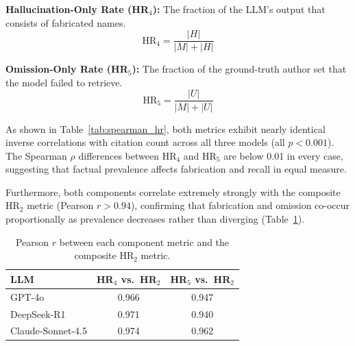 \documentclass[11pt]{article}
\begin{document}
\textbf{Hallucination-Only Rate (HR$_4$):} The fraction of the LLM's output that consists of fabricated names.
\begin{equation}
    \text{HR}_4 = \frac{|H|}{|M| + |H|}\label{eqn:hr4}
\end{equation}

\textbf{Omission-Only Rate (HR$_5$):} The fraction of the ground-truth author set that the model failed to retrieve.
\begin{equation}
    \text{HR}_5 = \frac{|U|}{|M| + |U|}\label{eqn:hr5}
\end{equation}

As shown in Table~\ref{tab:spearman_hr}, both metrics exhibit nearly identical inverse correlations with citation count across all three models (all $p < 0.001$). The Spearman $\rho$ differences between HR$_4$ and HR$_5$ are below 0.01 in every case, suggesting that factual prevalence affects fabrication and recall in equal measure.

\begin{table}[tb!]
  \centering
  \caption{Spearman $\rho$ between citation count and each hallucination metric across all three models. All $p < 0.001$.}
  \label{tab:spearman_hr}
\end{table}

Furthermore, both components correlate extremely strongly with the composite HR$_2$ metric (Pearson $r > 0.94$), confirming that fabrication and omission co-occur proportionally as prevalence decreases rather than diverging (Table~\ref{tab:pearson_hr}).

\begin{table}[tb!]
  \centering
  \small

  \begin{tabular}{@{}lcc@{}}
    \toprule
    \textbf{LLM} & \textbf{HR$_4$ vs.\ HR$_2$} & \textbf{HR$_5$ vs.\ HR$_2$} \\
    \midrule
    GPT-4o              & 0.966 & 0.947 \\
    DeepSeek-R1         & 0.971 & 0.940 \\
    Claude-Sonnet-4.5   & 0.974 & 0.962 \\
    \bottomrule
  \end{tabular}
  \caption{Pearson $r$ between each component metric and the composite HR$_2$ metric.}
  \label{tab:pearson_hr}
\end{table}
\end{document}
